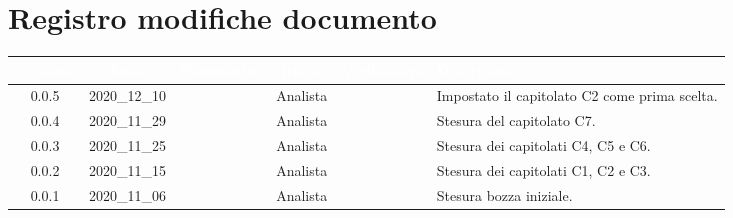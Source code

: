 \section*{Registro modifiche documento}
{
\renewcommand{\arraystretch}{1.5}
\centering
\begin{longtable}{ c c  C{2.3cm} c C{3cm} C{3.2cm}}


 \textcolor{white}{\textbf{Versione}} &
    \textcolor{white}{\textbf{Data}} &
    \textcolor{white}{\textbf{Nominativo}} &
    \textcolor{white}{\textbf{Ruolo}} &
    \textcolor{white}{\textbf{Verificatore}} &
    \textcolor{white}{\textbf{Descrizione}}\\	
    \endhead
    
    0.0.5 & 2020\_12\_10 & \FF{} & Analista & \TG{} & Impostato il capitolato C2 come prima scelta.  \\

    0.0.4 & 2020\_11\_29 & \FF{} & Analista & \TG{} & Stesura del capitolato C7.  \\
    
    0.0.3 & 2020\_11\_25 & \FF{} & Analista & \TG{} & Stesura dei capitolati C4, C5 e C6.  \\
    
    0.0.2 & 2020\_11\_15 & \FF{} & Analista & \TG{} & Stesura dei capitolati C1, C2 e C3.  \\
            
    0.0.1 & 2020\_11\_06 & \FF{} & Analista & \TG{} & Stesura bozza iniziale.  \\
			
\end{longtable}
}